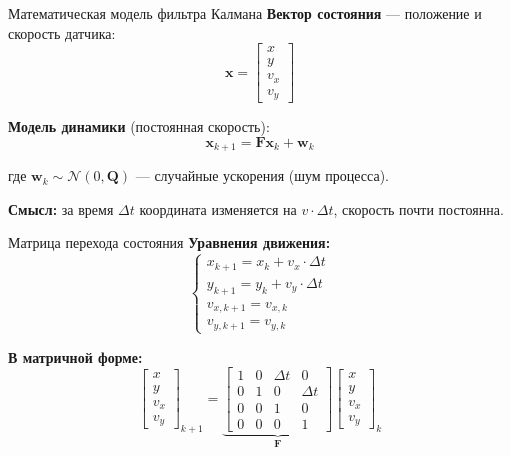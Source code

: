 \documentclass[aspectratio=169, 12pt]{beamer}
\begin{document}
\begin{frame}{Математическая модель фильтра Калмана}
    \textbf{Вектор состояния} --- положение и скорость датчика:
    \[
    \mathbf{x} = \begin{bmatrix} x \\ y \\ v_x \\ v_y \end{bmatrix}
    \]
    
    \vspace{0.3cm}
    \textbf{Модель динамики} (постоянная скорость):
    \[
    \mathbf{x}_{k+1} = \mathbf{F} \mathbf{x}_k + \mathbf{w}_k
    \]
    
    где $\mathbf{w}_k \sim \mathcal{N}(0, \mathbf{Q})$ --- случайные ускорения (шум процесса).
    
    \vspace{0.3cm}
    \textbf{Смысл:} за время $\Delta t$ координата изменяется на $v \cdot \Delta t$, скорость почти постоянна.
\end{frame}

\begin{frame}{Матрица перехода состояния}
    \textbf{Уравнения движения:}
    \[
    \begin{cases}
        x_{k+1} = x_k + v_x \cdot \Delta t \\
        y_{k+1} = y_k + v_y \cdot \Delta t \\
        v_{x,k+1} = v_{x,k} \\
        v_{y,k+1} = v_{y,k}
    \end{cases}
    \]
    
    \vspace{0.3cm}
    \textbf{В матричной форме:}
    \[
    \begin{bmatrix} x \\ y \\ v_x \\ v_y \end{bmatrix}_{k+1} = 
    \underbrace{\begin{bmatrix} 
        1 & 0 & \Delta t & 0 \\ 
        0 & 1 & 0 & \Delta t \\ 
        0 & 0 & 1 & 0 \\ 
        0 & 0 & 0 & 1 
    \end{bmatrix}}_{\mathbf{F}}
    \begin{bmatrix} x \\ y \\ v_x \\ v_y \end{bmatrix}_{k}
    \]
\end{frame}
\end{document}
